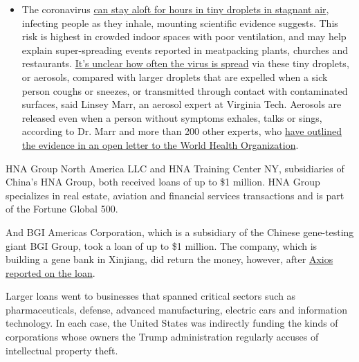 \begin{itemize}
  \begin{itemize}
  \tightlist
  \item
    The coronavirus
    \href{https://www.nytimes3xbfgragh.onion/2020/07/04/health/239-experts-with-one-big-claim-the-coronavirus-is-airborne.html?action=click\&pgtype=Article\&state=default\&region=MAIN_CONTENT_3\&context=storylines_faq}{can
    stay aloft for hours in tiny droplets in stagnant air}, infecting
    people as they inhale, mounting scientific evidence suggests. This
    risk is highest in crowded indoor spaces with poor ventilation, and
    may help explain super-spreading events reported in meatpacking
    plants, churches and restaurants.
    \href{https://www.nytimes3xbfgragh.onion/2020/07/06/health/coronavirus-airborne-aerosols.html?action=click\&pgtype=Article\&state=default\&region=MAIN_CONTENT_3\&context=storylines_faq}{It's
    unclear how often the virus is spread} via these tiny droplets, or
    aerosols, compared with larger droplets that are expelled when a
    sick person coughs or sneezes, or transmitted through contact with
    contaminated surfaces, said Linsey Marr, an aerosol expert at
    Virginia Tech. Aerosols are released even when a person without
    symptoms exhales, talks or sings, according to Dr. Marr and more
    than 200 other experts, who
    \href{https://academic.oup.com/cid/article/doi/10.1093/cid/ciaa939/5867798}{have
    outlined the evidence in an open letter to the World Health
    Organization}.
  \end{itemize}
\end{itemize}

HNA Group North America LLC and HNA Training Center NY, subsidiaries of
China's HNA Group, both received loans of up to \$1 million. HNA Group
specializes in real estate, aviation and financial services transactions
and is part of the Fortune Global 500.

And BGI Americas Corporation, which is a subsidiary of the Chinese
gene-testing giant BGI Group, took a loan of up to \$1 million. The
company, which is building a gene bank in Xinjiang, did return the
money, however, after
\href{https://www.axios.com/chinese-biotech-us-subsidiary-ppp-loan-8134a863-3779-46c4-9190-ceca54ba00ca.html}{Axios
reported on the loan}.

Larger loans went to businesses that spanned critical sectors such as
pharmaceuticals, defense, advanced manufacturing, electric cars and
information technology. In each case, the United States was indirectly
funding the kinds of corporations whose owners the Trump administration
regularly accuses of intellectual property theft.

